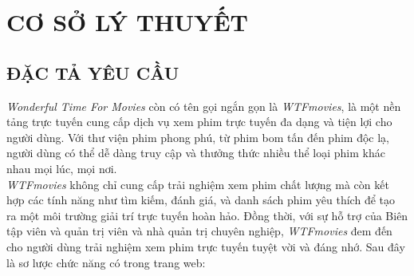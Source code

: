 \chapter{CƠ SỞ LÝ THUYẾT}
\section{ĐẶC TẢ YÊU CẦU}


\textit{Wonderful Time For Movies}  còn có tên gọi ngắn gọn là \textit{WTFmovies}, là một nền tảng trực tuyến cung cấp dịch vụ xem phim trực tuyến đa dạng và tiện lợi cho người dùng. Với thư viện phim phong phú, từ phim bom tấn đến phim độc lạ, người dùng có thể dễ dàng truy cập và thưởng thức nhiều thể loại phim khác nhau mọi lúc, mọi nơi.\\ \textit{WTFmovies} không chỉ cung cấp trải nghiệm xem phim chất lượng mà còn kết hợp các tính năng như tìm kiếm, đánh giá, và danh sách phim yêu thích để tạo ra một môi trường giải trí trực tuyến hoàn hảo. Đồng thời, với sự hỗ trợ của Biên tập viên và quản trị viên và nhà quản trị chuyên nghiệp, \textit{WTFmovies} đem đến cho người dùng trải nghiệm xem phim trực tuyến tuyệt vời và đáng nhớ. Sau đây là sơ lược chức năng có trong trang web:


